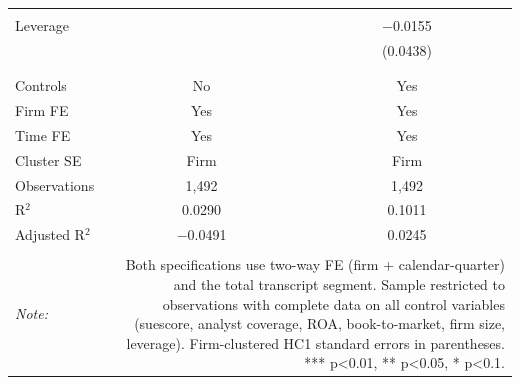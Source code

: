 \begin{table}[!htbp]
\begin{tabular}{@{\extracolsep{5pt}}lcc}
  & & \\ 
 Leverage &  & $-$0.0155 \\ 
  &  & (0.0438) \\ 
  & & \\ 
\hline \\[-1.8ex] 
Controls & No & Yes \\ 
Firm FE & Yes & Yes \\ 
Time FE & Yes & Yes \\ 
Cluster SE & Firm & Firm \\ 
Observations & 1,492 & 1,492 \\ 
R$^{2}$ & 0.0290 & 0.1011 \\ 
Adjusted R$^{2}$ & $-$0.0491 & 0.0245 \\ 
\hline 
\hline \\[-1.8ex] 
\textit{Note:}  & \multicolumn{2}{r}{Both specifications use two-way FE (firm + calendar-quarter) and the total transcript segment. Sample restricted to observations with complete data on all control variables (suescore, analyst coverage, ROA, book-to-market, firm size, leverage). Firm-clustered HC1 standard errors in parentheses. *** p<0.01, ** p<0.05, * p<0.1.} \\ 
\end{tabular} 
\end{table} 
